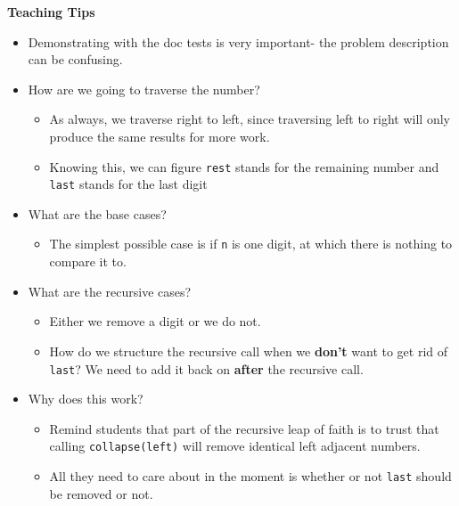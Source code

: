 \begin{blocksection}
\begin{guide}
\textbf{Teaching Tips}
\begin{itemize}
  \item Demonstrating with the doc tests is very important- the problem description can be confusing.
  \item How are we going to traverse the number?
  \begin{itemize}
    \item As always, we traverse right to left, since traversing left to right will only produce the same results for more work.
    \item Knowing this, we can figure \lstinline{rest} stands for the remaining number and \lstinline{last} stands for the last digit
  \end{itemize}
  \item What are the base cases?
  \begin{itemize}
    \item The simplest possible case is if \lstinline{n} is one digit, at which there is nothing to compare it to.
  \end{itemize}
  \item What are the recursive cases?
  \begin{itemize}
    \item Either we remove a digit or we do not.
    \item How do we structure the recursive call when we \textbf{don't} want to get rid of \lstinline{last}? We need to add it back on \textbf{after} the recursive call.
  \end{itemize}
  \item Why does this work?
  \begin{itemize}
    \item Remind students that part of the recursive leap of faith is to trust that calling \lstinline{collapse(left)} will remove identical left adjacent numbers.
    \item All they need to care about in the moment is whether or not \lstinline{last} should be removed or not.
  \end{itemize}
\end{itemize}
\end{guide}
\end{blocksection}
